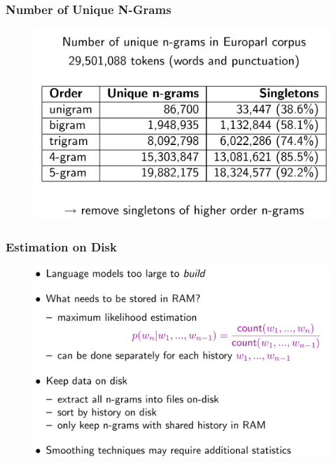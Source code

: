 \documentclass{beamer}
\begin{document}
\begin{frame}\frametitle{Number of Unique N-Grams}
\begin{figure}
\includegraphics[width=0.8\linewidth]{figure/number_of_ngram.pdf}
\end{figure}
\end{frame}


\begin{frame}\frametitle{Estimation on Disk}
\begin{figure}
\includegraphics[width=0.9\linewidth]{figure/estimiation_on_disk.pdf}
\end{figure}
\end{frame}
\end{document}
